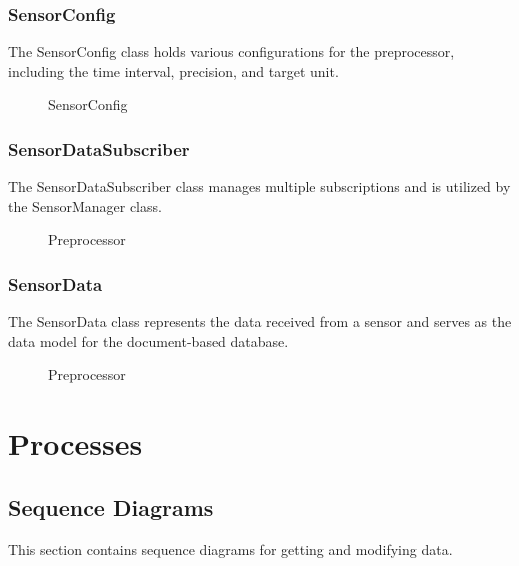 \documentclass[12pt]{article}
\newcounter{fr}
\begin{document}
\subsubsection{SensorConfig}
The SensorConfig class holds various configurations for the preprocessor, including the time interval, precision, and target unit.
\begin{figure}[ht]
\centering

\caption{\label{fig:bild14} SensorConfig}
\end{figure}

\newpage
\subsubsection{SensorDataSubscriber}
The SensorDataSubscriber class manages multiple subscriptions and is utilized by the SensorManager class.
\begin{figure}[ht]
\centering

\caption{\label{fig:bild15} Preprocessor}
\end{figure}

\subsubsection{SensorData}
The SensorData class represents the data received from a sensor and serves as the data model for the document-based database.
\begin{figure}[ht]
\centering

\caption{\label{fig:bild16} Preprocessor}
\end{figure}

\newpage
\section{Processes}
\subsection{Sequence Diagrams}
This section contains sequence diagrams for getting and modifying data.
\end{document}
